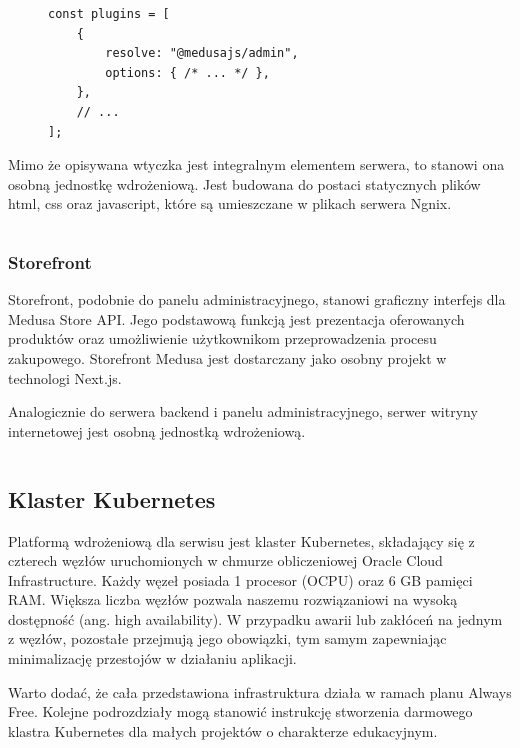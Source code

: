 \begin{figure}[H]
    \begin{verbatim}
const plugins = [
    {
        resolve: "@medusajs/admin",
        options: { /* ... */ },
    },
    // ...
];
    \end{verbatim}
\end{figure}

Mimo że opisywana wtyczka jest integralnym elementem serwera, to stanowi ona osobną jednostkę wdrożeniową.
Jest budowana do postaci statycznych plików html, css oraz javascript, które są umieszczane w plikach serwera Ngnix.


\begin{figure}[H]
    \inputminted{docker}{code/Dockerfile.admin}
\end{figure}

\subsubsection{Storefront}

Storefront, podobnie do panelu administracyjnego, stanowi graficzny interfejs dla Medusa Store API.
Jego podstawową funkcją jest prezentacja oferowanych produktów oraz umożliwienie użytkownikom przeprowadzenia procesu zakupowego.
Storefront Medusa jest dostarczany jako osobny projekt w technologi Next.js.

Analogicznie do serwera backend i panelu administracyjnego, serwer witryny internetowej jest osobną jednostką wdrożeniową.

\begin{figure}[H]
    \inputminted{docker}{code/Dockerfile.storefront}
\end{figure}

\subsection{Klaster Kubernetes}

Platformą wdrożeniową dla serwisu jest klaster Kubernetes\cite{what-is-kubernetes}, składający się z czterech węzłów uruchomionych w chmurze obliczeniowej Oracle Cloud Infrastructure.
Każdy węzeł posiada 1 procesor (OCPU) oraz 6 GB pamięci RAM. Większa liczba węzłów pozwala naszemu rozwiązaniowi na wysoką dostępność (ang. high availability).
W przypadku awarii lub zakłóceń na jednym z węzłów, pozostałe przejmują jego obowiązki, tym samym zapewniając minimalizację przestojów w działaniu aplikacji.

Warto dodać, że cała przedstawiona infrastruktura działa w ramach planu Always Free.
Kolejne podrozdziały mogą stanowić instrukcję stworzenia darmowego klastra Kubernetes dla małych projektów o charakterze edukacyjnym.

